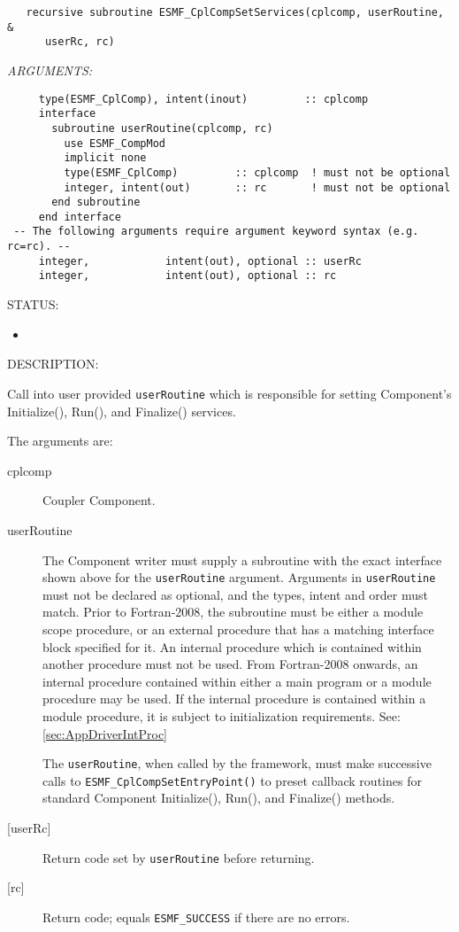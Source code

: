   
\begin{verbatim}   recursive subroutine ESMF_CplCompSetServices(cplcomp, userRoutine, &
      userRc, rc)\end{verbatim}{\em ARGUMENTS:}
\begin{verbatim}     type(ESMF_CplComp), intent(inout)         :: cplcomp
     interface
       subroutine userRoutine(cplcomp, rc)
         use ESMF_CompMod
         implicit none
         type(ESMF_CplComp)         :: cplcomp  ! must not be optional
         integer, intent(out)       :: rc       ! must not be optional
       end subroutine
     end interface
 -- The following arguments require argument keyword syntax (e.g. rc=rc). --
     integer,            intent(out), optional :: userRc
     integer,            intent(out), optional :: rc\end{verbatim}
{\sf STATUS:}
   \begin{itemize}
   \item{}
   \end{itemize}
  
{\sf DESCRIPTION:\\ }


   \label{CplComp:SetServices}
   Call into user provided {\tt userRoutine} which is responsible
   for setting Component's Initialize(), Run(), and Finalize() services.
  
   The arguments are:
   \begin{description}
   \item[cplcomp]
     Coupler Component.
   \item[userRoutine]
    The Component writer must supply a subroutine with the exact interface
    shown above for the {\tt userRoutine} argument. Arguments in {\tt userRoutine}
    must not be declared as optional, and the types, intent and order must match.
     Prior to Fortran-2008, the subroutine must be either a module scope procedure,
     or an external procedure that has a matching interface block specified for it.
     An internal procedure which is contained within another procedure must not be used.
     From Fortran-2008 onwards, an internal procedure contained within either a main program
     or a module procedure may be used.  If the internal procedure is contained within a
     module procedure, it is subject to initialization requirements.  See: \ref{sec:AppDriverIntProc}
  
    \begin{sloppypar}
    The {\tt userRoutine}, when called by the framework, must make successive calls to
    {\tt ESMF\_CplCompSetEntryPoint()} to preset callback routines for standard
    Component Initialize(), Run(), and Finalize() methods.
    \end{sloppypar}
   \item[{[userRc]}]
     Return code set by {\tt userRoutine} before returning.
   \item[{[rc]}]
     Return code; equals {\tt ESMF\_SUCCESS} if there are no errors.
   \end{description}
   
